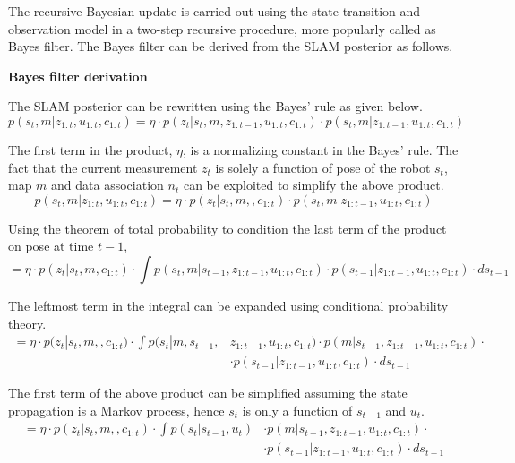 The recursive Bayesian update is carried out using the state transition and observation model in a two-step recursive procedure, more popularly called as Bayes filter. The Bayes filter can be derived from the SLAM posterior as follows.

\textbf{Bayes filter derivation}

The SLAM posterior can be rewritten using the Bayes' rule as given below.
\begin{equation}
p(s_t,m|z_{1:t},u_{1:t},c_{1:t}) = \eta\cdot p(z_t|s_t,m,z_{1:t-1},u_{1:t},c_{1:t})\cdot p(s_t,m|z_{1:t-1},u_{1:t},c_{1:t})
\end{equation}

The first term in the product, $\eta$, is a normalizing constant in the Bayes' rule. The fact that the current measurement $z_t$ is solely a function of pose of the robot $s_t$, map $m$ and data association $n_t$ can be exploited to simplify the above product. 
\begin{equation}
p(s_t,m|z_{1:t},u_{1:t},c_{1:t}) = \eta\cdot p(z_t|s_t,m,,c_{1:t})\cdot p(s_t,m|z_{1:t-1},u_{1:t},c_{1:t})
\end{equation}

Using the theorem of total probability to condition the last term of the product on pose at time $t-1$,
\begin{equation}
= \eta\cdot p(z_t|s_t,m,c_{1:t})\cdot\int p(s_t,m|s_{t-1},z_{1:t-1},u_{1:t},c_{1:t})\cdot p(s_{t-1}|z_{1:t-1},u_{1:t},c_{1:t})\cdot ds_{t-1}
\end{equation}

The leftmost term in the integral can be expanded using conditional probability theory.
\begin{equation}
\begin{split}
= \eta\cdot p(z_t|s_t,m,,c_{1:t})\cdot\int p(s_t|m,s_{t-1},&z_{1:t-1},u_{1:t},c_{1:t})\cdot p(m|s_{t-1},z_{1:t-1},u_{1:t},c_{1:t})\cdot \\
&\cdot p(s_{t-1}|z_{1:t-1},u_{1:t},c_{1:t})\cdot ds_{t-1}
\end{split}
\end{equation}

The first term of the above product can be simplified assuming the state propagation is a Markov process, hence $s_t$ is only a function of $s_{t-1}$ and $u_t$. 
\begin{equation}
\begin{split}
= \eta\cdot p(z_t|s_t,m,,c_{1:t})\cdot\int p(s_t|s_{t-1},u_t)&\cdot p(m|s_{t-1},z_{1:t-1},u_{1:t},c_{1:t})\cdot \\
&\cdot p(s_{t-1}|z_{1:t-1},u_{1:t},c_{1:t})\cdot ds_{t-1}
\end{split}
\end{equation}

